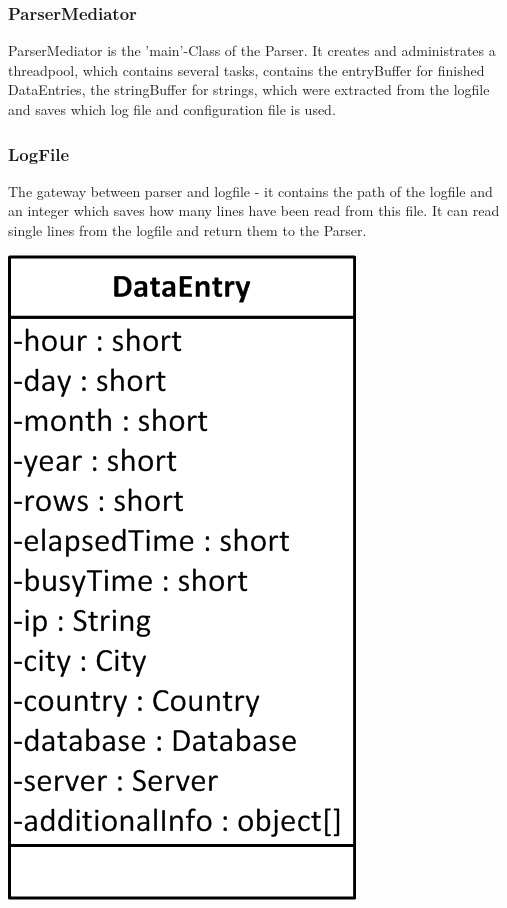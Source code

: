 \subsubsection*{ParserMediator}
ParserMediator is the 'main'-Class of the Parser. It creates and administrates a threadpool, which contains several tasks, 
contains the entryBuffer for finished DataEntries, the stringBuffer for strings, which were extracted 
from the logfile and saves which log file and configuration file is used.

\subsubsection*{LogFile}
The gateway between parser and logfile - it contains the path of the logfile and an integer 
which saves how many lines have been read from this file. It can read single lines from the logfile and return them to 
the Parser.

\begin{center}
\includegraphics{Pictures/Parts/DataEntry.png}
\end{center}  

